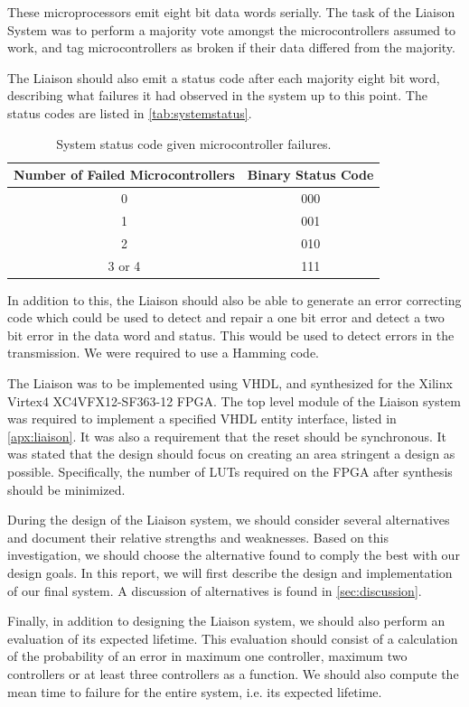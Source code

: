 These microprocessors emit eight bit data words serially. The task of
the Liaison System was to perform a majority vote amongst the
microcontrollers assumed to work, and tag microcontrollers as broken
if their data differed from the majority.

The Liaison should also emit a status code after each majority eight
bit word, describing what failures it had observed in the system up to
this point. The status codes are listed in \autoref{tab:systemstatus}.

\begin{table}[htbp]
  \centering
  \begin{tabular}{|c|c|}
    \hline
    \textbf{Number of Failed Microcontrollers} & \textbf{Binary Status Code} \\ \hline
    0 & 000 \\ \hline
    1 & 001 \\ \hline
    2 & 010 \\ \hline
    3 or 4 & 111 \\ \hline
  \end{tabular}
  \caption{System status code given microcontroller failures.}
  \label{tab:systemstatus}
\end{table}

In addition to this, the Liaison should also be able to generate an
error correcting code which could be used to detect and repair a one
bit error and detect a two bit error in the data word and status. This
would be used to detect errors in the transmission. We were required
to use a Hamming code\cite{task}\cite{ecc}.

The Liaison was to be implemented using VHDL, and synthesized for the
Xilinx Virtex4 XC4VFX12-SF363-12 FPGA. The top level module of the
Liaison system was required to implement a specified VHDL entity
interface, listed in \autoref{apx:liaison}. It was also a requirement
that the {\ttfamily reset} should be synchronous. It was stated that the
design should focus on creating an area stringent a design as
possible. Specifically, the number of LUTs required on the FPGA after
synthesis should be minimized.

During the design of the Liaison system, we should consider several
alternatives and document their relative strengths and
weaknesses. Based on this investigation, we should choose the
alternative found to comply the best with our design goals. In this
report, we will first describe the design and implementation of our
final system. A discussion of alternatives is found in
\autoref{sec:discussion}.

Finally, in addition to designing the Liaison system, we should also
perform an evaluation of its expected lifetime. This evaluation should
consist of a calculation of the probability of an error in maximum one
controller, maximum two controllers or at least three controllers as a
function. We should also compute the mean time to failure for the
entire system, i.e. its expected lifetime.
